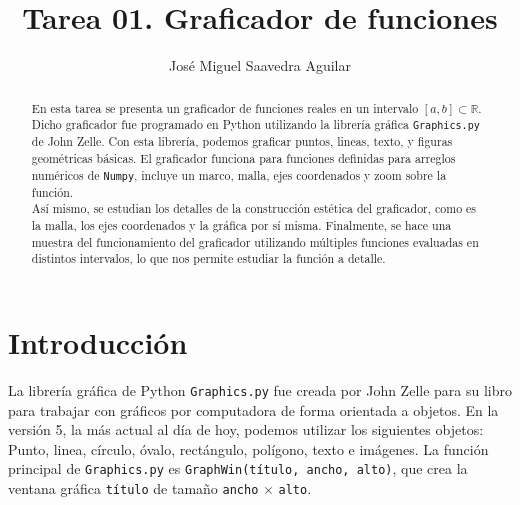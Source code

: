 \documentclass[10pt]{article}
\author{José Miguel Saavedra Aguilar}
\title{Tarea 01. Graficador de funciones}
\begin{document}
\maketitle
\begin{abstract}
En esta tarea se presenta un graficador de funciones reales en un intervalo $\left[ a,b \right] \subset \mathbb{R}$. Dicho graficador fue programado en Python utilizando la librería gráfica \texttt{Graphics.py} de John Zelle. Con esta librería, podemos graficar puntos, lineas, texto, y figuras geométricas básicas. El graficador funciona para funciones definidas para arreglos numéricos de \texttt{Numpy}, incluye un marco, malla, ejes coordenados y zoom sobre la función.\\
Así mismo, se estudian los detalles de la construcción estética del graficador, como es la malla, los ejes coordenados y la gráfica por sí misma. Finalmente, se hace una muestra del funcionamiento del graficador utilizando múltiples funciones evaluadas en distintos intervalos, lo que nos permite estudiar la función a detalle.
\end{abstract}
\section{Introducción}
La librería gráfica de Python \texttt{Graphics.py} fue creada por John Zelle para su libro \cite{Zelle2004} para trabajar con gráficos por computadora de forma orientada a objetos. En la versión 5, la más actual al día de hoy, podemos utilizar los siguientes objetos: Punto, linea, círculo, óvalo, rectángulo, polígono, texto e imágenes. La función principal de \texttt{Graphics.py} es \texttt{GraphWin(título, ancho, alto)}, que crea la ventana gráfica \texttt{título} de tamaño \texttt{ancho} $\times$ \texttt{alto}.
\end{document}
